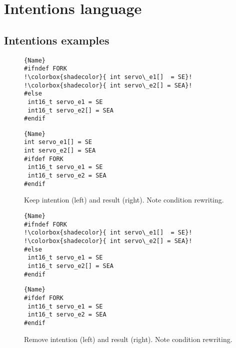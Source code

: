 \chapter{Intentions language}
\section{Intentions examples}
\cite{lillack2017intentions}

\begin{figure}[ht]
    \centering
    \begin{minipage}{.35\textwidth}
\begin{lstlisting}[caption=Wrapped code by PC,escapechar=!]{Name}
#ifndef FORK
!\colorbox{shadecolor}{ int servo\_e1[]  = SE}!
!\colorbox{shadecolor}{ int servo\_e2[] = SEA}!
#else
 int16_t servo_e1 = SE
 int16_t servo_e2[] = SEA
#endif
\end{lstlisting}
\end{minipage}\qquad
\begin{minipage}{.35\textwidth}
\begin{lstlisting}[caption=Unwrapped code,escapechar=!]{Name}
int servo_e1[] = SE
int servo_e2[] = SEA
#ifdef FORK
 int16_t servo_e1 = SE
 int16_t servo_e2 = SEA
#endif
\end{lstlisting}
    \end{minipage}
    \caption{Keep intention (left) and result (right). Note condition rewriting.}
    \label{fig:keep}
\end{figure}

\begin{figure}[ht]
    \centering
    \begin{minipage}{.35\textwidth}
\begin{lstlisting}[caption=Wrapped code by PC,escapechar=!]{Name}
#ifndef FORK
!\colorbox{shadecolor}{ int servo\_e1[]  = SE}!
!\colorbox{shadecolor}{ int servo\_e2[] = SEA}!
#else
 int16_t servo_e1 = SE
 int16_t servo_e2[] = SEA
#endif
\end{lstlisting}
\end{minipage}\qquad
\begin{minipage}{.35\textwidth}
\begin{lstlisting}[caption=Unwrapped code,escapechar=!]{Name}
#ifdef FORK
 int16_t servo_e1 = SE
 int16_t servo_e2 = SEA
#endif
\end{lstlisting}
    \end{minipage}
    \caption{Remove intention (left) and result (right). Note condition rewriting.}
    \label{fig:remove}
\end{figure}

